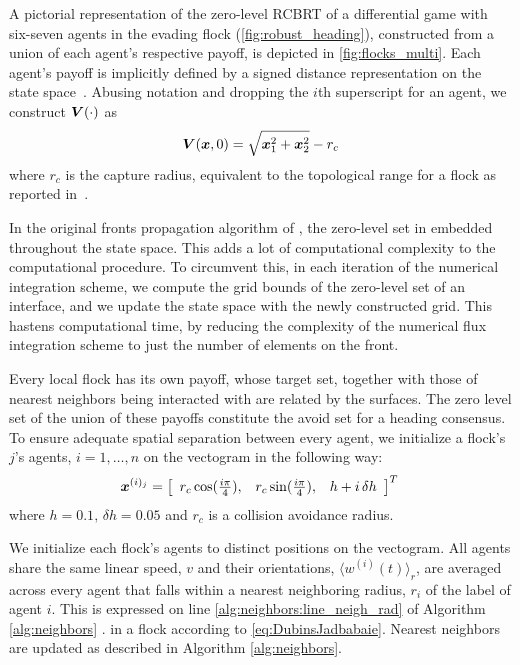 %
A pictorial representation of the zero-level RCBRT of a differential  game with six-seven agents in the evading flock (\cf\autoref{fig:robust_heading}), constructed from a union of each agent's respective payoff,  is depicted in \autoref{fig:flocks_multi}. Each agent's payoff is implicitly defined by a signed distance representation on the state space~\cite{LevelSetsBook}. Abusing notation and dropping the $i$th superscript for an agent, we construct $\bm{V}(\cdot)$ as 
%
\begin{align}
	\bm{V}(\bm{x}, 0) = \sqrt{\bm{x}_1^2 + \bm{x}_2^2} - r_c
\end{align}
%
where $r_c$ is the capture radius, equivalent to the topological range for a flock as reported in~\cite{Ballerini1232}. 

In the original fronts propagation algorithm of \cite{OsherFronts}, the zero-level set in embedded throughout the state space. This adds a lot of computational complexity to the computational procedure. To circumvent this, in each iteration of the numerical integration scheme, we compute the grid bounds of the zero-level set of an interface, and we update the state space with the newly constructed grid. This hastens computational time, by reducing the complexity of the numerical flux integration scheme to just the number of elements on the front. 


Every local flock has its own payoff, whose target set, together with those of nearest neighbors being interacted with are related by the surfaces. The zero level set of the union of these payoffs constitute the avoid set for a heading consensus. To ensure adequate spatial separation between every agent, we initialize a flock's $j$'s agents, $i=1,\ldots, n$ on the vectogram in the following way:
%
\begin{align}
	\state^{(i)_j} = \left[\begin{array}{ccc}
		r_c \cos (\frac{i\pi}{4}), & 	r_c \sin (\frac{i\pi}{4}), & h+i\,\delta h
	\end{array}\right]^T \, %
\end{align}
%
where $h=0.1, \, \delta h = 0.05$ and $r_c$ is a collision avoidance radius.

We initialize each flock's agents to distinct positions on the vectogram. All agents share the same linear speed, $v$ and their orientations, $\langle w^{(i)} (t) \rangle_r$, are averaged  across every agent that falls within a nearest neighboring radius, $r_i$ of the label of agent $i$. This is expressed on line \ref{alg:neighbors:line_neigh_rad} of Algorithm \ref{alg:neighbors} . in a flock according to \eqref{eq:DubinsJadbabaie}. Nearest neighbors are updated as described in Algorithm \ref{alg:neighbors}. 

